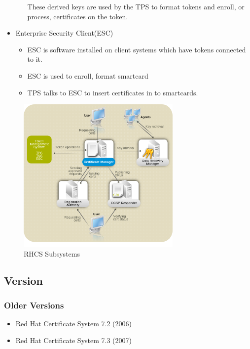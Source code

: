 \documentclass[12pt]{report}
\begin{document}
\begin{itemize}
\begin{itemize}
                    These derived keys are used by the TPS to format tokens and enroll, or process, certificates on the token.
            \end{itemize}
        \item Enterprise Security Client(ESC)
            \begin{itemize}
                \item ESC is software installed on client systems which have tokens connected to it.
                \item ESC is used to enroll, format smartcard 
                \item TPS talks to ESC to insert certificates in to smartcards.
            \end{itemize}
    \end{itemize}
    \begin{figure}[H]
        \centering
        \includegraphics[width=80mm]{Images/rhcs-subsystem-overview.png}
        \caption{RHCS Subsystems ~\cite{RedHat:CSoverview}}
    \end{figure}
\subsection{Version}
    \subsubsection{Older Versions}
        \begin{itemize}
            \item Red Hat Certificate System 7.2 (2006) 
            \item Red Hat Certificate System 7.3 (2007)
        \end{itemize}
\end{document}
